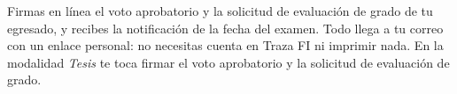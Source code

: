 \documentclass[11pt,a4paper]{article}
\begin{document}
{\small\tableofcontents}
\newpage
\begin{quevasahacer}
Firmas en línea el voto aprobatorio y la solicitud de evaluación de grado de tu egresado, y recibes la notificación de la fecha del examen. Todo llega a tu correo con un enlace personal: no necesitas cuenta en Traza FI ni imprimir nada. En la modalidad \emph{Tesis} te toca firmar el voto aprobatorio y la solicitud de evaluación de grado.
\end{quevasahacer}




\end{document}
